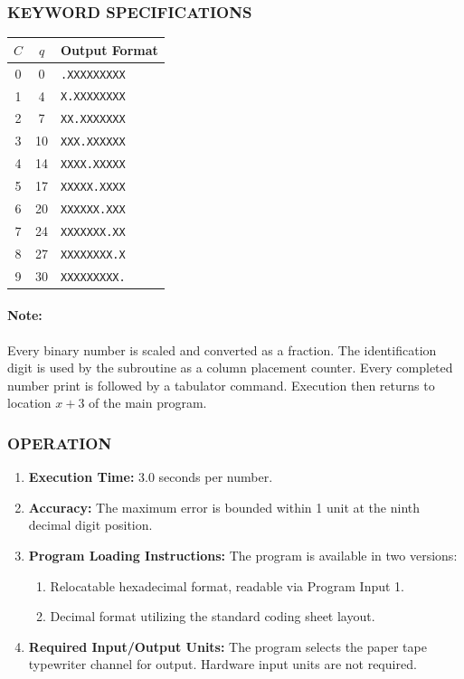 \subsubsection*{KEYWORD SPECIFICATIONS}
\begin{center}
\begin{tabular}{ccl}
    \toprule
    \textbf{$C$} & \textbf{$q$} & \textbf{Output Format} \\
    \midrule
    0            & 0            & \texttt{.XXXXXXXXX}    \\
    1            & 4            & \texttt{X.XXXXXXXX}    \\
    2            & 7            & \texttt{XX.XXXXXXX}    \\
    3            & 10           & \texttt{XXX.XXXXXX}    \\
    4            & 14           & \texttt{XXXX.XXXXX}    \\
    5            & 17           & \texttt{XXXXX.XXXX}    \\
    6            & 20           & \texttt{XXXXXX.XXX}    \\
    7            & 24           & \texttt{XXXXXXX.XX}    \\
    8            & 27           & \texttt{XXXXXXXX.X}    \\
    9            & 30           & \texttt{XXXXXXXXX.}    \\
    \bottomrule
\end{tabular}
\end{center}

\paragraph{Note:}
Every binary number is scaled and converted as a fraction. The identification digit is used by the subroutine as a column placement counter. Every completed number print is followed by a tabulator command. Execution then returns to location $x+3$ of the main program.

\subsubsection*{OPERATION}
\begin{enumerate}
    \item \textbf{Execution Time:} 3.0 seconds per number.
    \item \textbf{Accuracy:} The maximum error is bounded within 1 unit at the ninth decimal digit position.
    \item \textbf{Program Loading Instructions:} The program is available in two versions:
    \begin{enumerate}[label=\alph*)]
        \item Relocatable hexadecimal format, readable via Program Input 1.
        \item Decimal format utilizing the standard coding sheet layout.
    \end{enumerate}
    \item \textbf{Required Input/Output Units:} The program selects the paper tape typewriter channel for output. Hardware input units are not required.
\end{enumerate}

